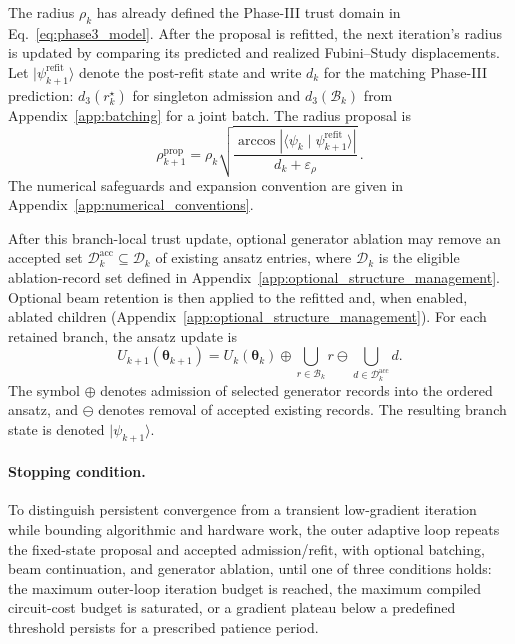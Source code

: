 \documentclass[
  reprint,
  amsmath,
  amssymb,
  aps,
  pra,
  nofootinbib,
  superscriptaddress,
  floatfix
]{revtex4-2}
\newcommand{\ket}[1]{|#1\rangle}
\begin{document}
The radius \(\rho_k\) has already defined the Phase-III trust domain in
Eq.~\eqref{eq:phase3_model}. After the proposal is refitted, the next
iteration's radius is updated by comparing its predicted and realized
Fubini--Study displacements. Let \(\ket{\psi_{k+1}^{\mathrm{refit}}}\) denote
the post-refit state and write \(d_k\) for the matching Phase-III prediction:
\(d_3(r_k^\star)\) for singleton admission and \(d_3(\mathcal B_k)\) from
Appendix~\ref{app:batching} for a joint batch.
The radius proposal is
\begin{equation}
\rho_{k+1}^{\mathrm{prop}}
=\rho_k\sqrt{
\frac{\arccos\!\left|\langle\psi_k\mid
\psi_{k+1}^{\mathrm{refit}}\rangle\right|}
{d_k+\varepsilon_\rho}}
\,.
\label{eq:adaptive_trust_radius}
\end{equation}
The numerical safeguards and expansion convention are given in
Appendix~\ref{app:numerical_conventions}.

After this branch-local trust update, optional generator ablation may remove an
accepted set \(\mathcal D_k^{\mathrm{acc}}\subseteq\mathcal D_k\) of existing
ansatz entries, where \(\mathcal D_k\) is the eligible ablation-record set
defined in Appendix~\ref{app:optional_structure_management}. Optional beam
retention is then applied to the refitted and, when enabled, ablated children
(Appendix~\ref{app:optional_structure_management}). For each retained branch,
the ansatz update is
%
\begin{equation*}
U_{k+1}(\boldsymbol\theta_{k+1})
=
U_k(\boldsymbol\theta_k)
\oplus
\bigcup_{r\in\mathcal B_k} r
\ominus
\bigcup_{d\in\mathcal D_k^{\mathrm{acc}}} d .
\end{equation*}
%
The symbol \(\oplus\) denotes admission of selected generator records into the
ordered ansatz, and \(\ominus\) denotes removal of accepted existing records.
The resulting branch state is denoted \(\ket{\psi_{k+1}}\).

\paragraph*{Stopping condition.}
To distinguish persistent convergence from a transient low-gradient iteration
while bounding algorithmic and hardware work, the outer adaptive loop repeats
the fixed-state proposal and accepted admission/refit, with optional batching,
beam continuation, and generator ablation,
until one of three conditions holds: the maximum outer-loop iteration budget is
reached, the maximum compiled circuit-cost budget is saturated, or a gradient
plateau below a predefined threshold persists for a prescribed patience
period.
\end{document}
